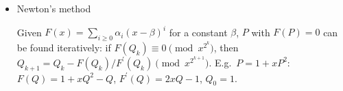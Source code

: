 \begin{itemize}
\item Newton's method

Given $F(x) = \sum_{i \ge 0} \alpha_i (x - \beta)^i$ for a constant $\beta$, $P$ with $F(P) = 0$ can be found iteratively: if $F(Q_k) \equiv 0 \pmod {x^{2^k}}$, then $Q_{k+1} = Q_k - F(Q_k) / F^\prime(Q_k) \pmod {x^{2^{k+1}}}$. E.g.\ $P = 1 + xP^2$: $F(Q) = 1 + xQ^2 - Q$, $F^\prime(Q) = 2xQ - 1$, $Q_0 = 1$.
\end{itemize}
